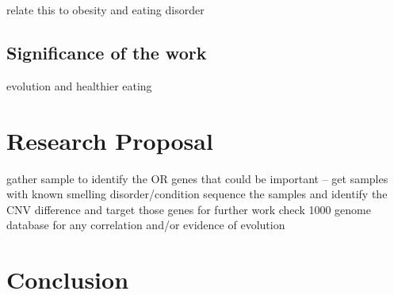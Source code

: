 \documentclass[a4paper, 12pt]{article}
\begin{document}
relate this to obesity and eating disorder

\subsection*{Significance of the work}

evolution and healthier eating

\section*{Research Proposal}

gather sample to identify the OR genes that could be important -- get samples with known smelling disorder/condition
sequence the samples and identify the CNV difference and target those genes for further work
check 1000 genome database for any correlation and/or evidence of evolution

\section*{Conclusion}
\end{document}
